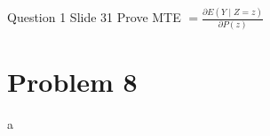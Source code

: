 \documentclass{article}
\begin{document}
\begin{problem}{Question 1 Slide 31}
Prove MTE $=\frac{\partial E(Y \mid Z=z)}{\partial P(z)}$
\end{problem}
\begin{solution}
\end{solution}

\newpage

\section*{Problem 8}
 
\begin{problem}{a}
\end{problem}
\begin{solution}
\end{solution}
\end{document}
